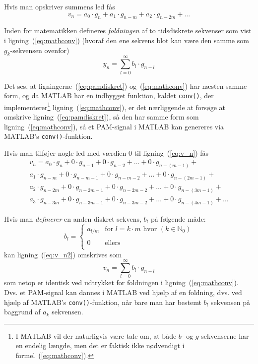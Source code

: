\documentclass[dvips,11pt,a4paper]{article}
\begin{document}
\noindent{}Hvis man opskriver summens led fås
\begin{equation}
v_{n} = a_{0}\cdot{}g_{n} + a_{1}\cdot{}g_{n-m} + a_{2}\cdot{}g_{n-2m} + \ldots{} 
\label{eq:v_n}
\end{equation}


\noindent{}Inden for matematikken defineres {\em foldningen} af to tidsdiskrete sekvenser som vist i ligning~(\ref{eq:mathconv}) (hvoraf den ene sekvens blot kan være den samme som $g_k$-sekvensen ovenfor)
\begin{equation}
y_n = \sum_{l=0}^{\infty} b_{l} \cdot g_{n-l}
\label{eq:mathconv}
\end{equation}

\noindent{}Det ses, at ligningerne~(\ref{eq:pamdiskret}) og~(\ref{eq:mathconv}) har næsten samme form, og da MATLAB har en indbygget funktion, kaldet \texttt{conv()}, der implementerer\footnote{I MATLAB vil der naturligvis være tale om, at både $b$- og $g$-sekvenserne har en endelig længde, men det er faktisk ikke nødvendigt i formel~(\ref{eq:mathconv}).}  ligning~(\ref{eq:mathconv}), er det nærliggende at forsøge at omskrive ligning~(\ref{eq:pamdiskret}), så den har samme form som ligning~(\ref{eq:mathconv}), så et PAM-signal i MATLAB kan genereres via MATLAB's \texttt{conv()}-funktion.

Hvis man tilføjer nogle led med værdien 0 til ligning~(\ref{eq:v_n}) fås
\begin{multline}
v_{n} = a_{0}\cdot{}g_{n} + 0\cdot{}g_{n-1} + 0\cdot{}g_{n-2} + \ldots + 0\cdot{}g_{n-(m-1)} +  \\
a_{1}\cdot{}g_{n-m} + 0\cdot{}g_{n-m-1} + 0\cdot{}g_{n-m-2} + \ldots + 0\cdot{}g_{n-(2m-1)} +  \\
a_{2}\cdot{}g_{n-2m} + 0\cdot{}g_{n-2m-1} + 0\cdot{}g_{n-2m-2} + \ldots + 0\cdot{}g_{n-(3m-1)} +  \\
a_{3}\cdot{}g_{n-3m} + 0\cdot{}g_{n-3m-1} + 0\cdot{}g_{n-3m-2} + \ldots + 0\cdot{}g_{n-(4m-1)} + \ldots{}
\label{eq:v_n2}
\end{multline}

\noindent{}Hvis man \emph{definerer} en anden diskret sekvens, $b_l$ på følgende måde:
\begin{equation}
b_{l}=\left\lbrace
\begin{array}{ll}
a_{l/m} & \textrm{for }l=k\cdot{}m\textrm{ hvor }(k\in{}\mathbb{N}_{0}) \\
 & \\
0 & \textrm{ellers}\\
\end{array}
\right.
\label{eq:bseq}
\end{equation}
kan ligning~(\ref{eq:v_n2}) omskrives som
\begin{equation}
v_n=\sum_{l=0}^{\infty} b_l\cdot{}g_{n-l}
\label{eq:v_n3}
\end{equation}
som netop er identisk ved udtrykket for foldningen i ligning~(\ref{eq:mathconv}). Dvs. et PAM-signal kan dannes i MATLAB ved hjælp af en foldning, dvs. ved hjælp af MATLAB's \texttt{conv()}-funktion, når bare man har bestemt $b_l$ sekvensen på baggrund af $a_k$ sekvensen.
\end{document}
